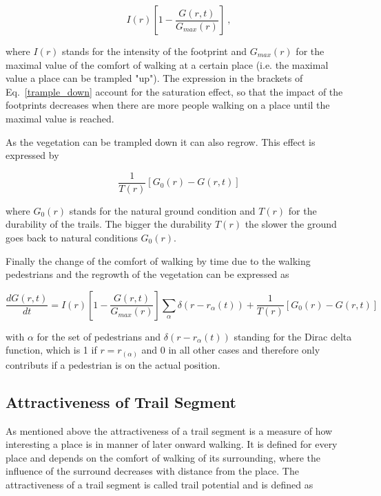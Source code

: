 \begin{equation}
\label{trample_down}
I(r)[1-\frac{G(r,t)}{G_{max}(r)}]\ ,
\end{equation}

where $I(r)$ stands for the intensity of the footprint and $G_{max}(r)$ for the maximal value of the comfort of walking at a certain place (i.e. the maximal value a place can be trampled "up"). The expression in the brackets of Eq.\ \ref{trample_down} account for the saturation effect, so that the impact of the footprints decreases when there are more people walking on a place until the maximal value is reached.

As the vegetation can be trampled down it can also regrow. This effect is expressed by

\begin{equation}
\frac{1}{T(r)}[G_0(r)-G(r,t)]
\end{equation}

where $G_0(r)$ stands for the natural ground condition and $T(r)$ for the durability of the trails. The bigger the durability $T(r)$ the slower the ground goes back to natural conditions $G_0(r)$.

Finally the change of the comfort of walking by time due to the walking pedestrians and the regrowth of the vegetation can be expressed as

\begin{equation}
\frac{dG(r,t)}{dt}=I(r)[1-\frac{G(r,t)}{G_{max}(r)}]\sum\limits_{\alpha} \delta(r-r_{\alpha}(t)) +\frac{1}{T(r)}[G_0(r)-G(r,t)]
\end{equation}

with $\alpha$ for the set of pedestrians and $\delta(r-r_{\alpha}(t))$ standing for the Dirac delta function, which is 1 if $r=r_(\alpha)$ and 0 in all other cases and therefore only contributs if a pedestrian is on the actual position.

\subsection{Attractiveness of Trail Segment}
\label{trail_potential}

As mentioned above the attractiveness of a trail segment is a measure of how interesting a place is in manner of later onward walking. It is defined for every place and depends on the comfort of walking of its surrounding, where the influence of the surround decreases with distance from the place. The attractiveness of a trail segment is called trail potential and is defined as

